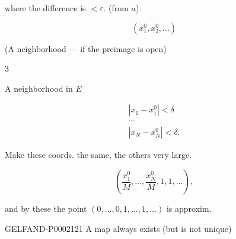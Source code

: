 where the difference is $<\varepsilon$. (from $a$).



\begin{equation*}(x_1^0, x_2^0,\ldots)\end{equation*}



(A neighborhood --- if the preimage is open)





\begin{flushright}$3$\end{flushright}



A neighborhood in $E$



\begin{equation*}\begin{gathered}|x_1-x_1^0|<\delta\\\cdots\\|x_N-x_N^0|<\delta.\end{gathered}\end{equation*}



Make these coords. the same, the others very large.



\begin{equation*}\left (\frac{x_1^0}{M},\ldots,\frac{x_N^0}{M},1,1,\ldots\right),\end{equation*}



and by these the point $(0,\ldots,0,1,\ldots,1,\ldots)$ is approxim.



\begin{GelfandAdjacentEvidence}{GELFAND-P000212}{1}
A map always exists (but is not unique)






\end{GelfandAdjacentEvidence}

